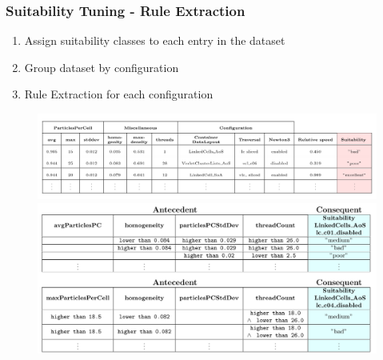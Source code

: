 \documentclass[
	10pt,
	t		%
]{beamer}
\begin{document}
\begin{frame}
	\frametitle{Suitability Tuning - Rule Extraction}
	
	\begin{enumerate}
		\item Assign suitability classes to each entry in the dataset
		\item Group dataset by configuration
		\item Rule Extraction for each configuration
	\end{enumerate}
	
	
	\begin{figure}
		\centering
		\includegraphics[width=1\textwidth, trim={0 2.25cm 0 0},clip]{figures/aggregated-data-suitability.png}
		\vspace{1.5cm}
		\includegraphics[width=1\textwidth, trim={0 9cm 0 0.1cm},clip]{figures/final-rules-suitability.png}
	\end{figure}
\end{frame}
\end{document}

